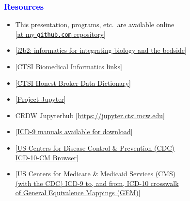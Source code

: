 \documentclass[11pt,pdftex,dvipsnames,usenames]{beamer}
\begin{document}
\begin{frame}[fragile]\frametitle{\bf\textcolor{blue}{Resources}}

\begin{itemize}
\item This presentation, programs, etc.\ are available online\\
\textcolor{PineGreen}{[\href{https://github.com/rsparapa/CTSI/tree/main/BERD}{at my \texttt{github.com} repository}]}
\item \textcolor{PineGreen}{[\href{https://www.i2b2.org}
{i2b2: informatics for integrating biology and the bedside}]}
\item \textcolor{PineGreen}{[\href{https://ctsi.mcw.edu/data-science-informatics/cbmi/crdw/bmi-resource-links}
{CTSI Biomedical Informatics links}]}
\item \textcolor{PineGreen}{[\href{https://share.ctsi.mcw.edu/s/8gj39XFxP9oeGGY}{CTSI Honest Broker Data Dictionary}]}
\item \textcolor{PineGreen}{[\href{https://en.wikipedia.org/wiki/Project_Jupyter}{Project Jupyter}]}
\item CRDW Jupyterhub \textcolor{PineGreen}{[\href{https://jupyter.ctsi.mcw.edu}{https://jupyter.ctsi.mcw.edu}]}
\item \textcolor{PineGreen}{[\href{https://www.cdc.gov/nchs/icd/icd9cm.htm}
{ICD-9 manuals available for download}]}
\item \textcolor{PineGreen}{[\href{https://icd10cmtool.cdc.gov}
{US Centers for Disease Control \& Prevention (CDC)\\ 
ICD-10-CM Browser}]}
\item \textcolor{PineGreen}{[\href{https://www.nber.org/research/data/icd-9-cm-and-icd-10-cm-and-icd-10-pcs-crosswalk-or-general-equivalence-mappings}
{US Centers for Medicare \& Medicaid Services (CMS) \\
(with the CDC) ICD-9 to, and from, ICD-10 crosswalk \\
of General Equivalence Mappings (GEM)}]}
\end{itemize}

\end{frame}
\end{document}
